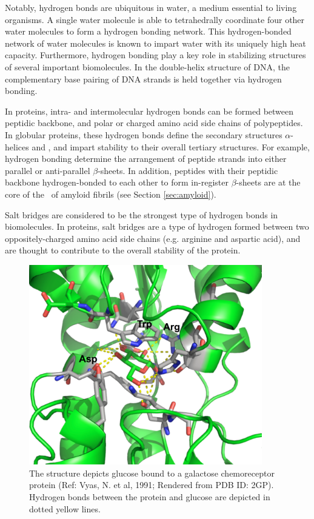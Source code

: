 Notably, hydrogen bonds are ubiquitous in water, a medium essential to living organisms. A single water molecule is able to tetrahedrally coordinate four other water molecules to form a hydrogen bonding network. This hydrogen-bonded network of water molecules is known to impart water with its uniquely high heat capacity.  Furthermore, hydrogen bonding play a key role in stabilizing structures of several important biomolecules.  In the double-helix structure of DNA,  the complementary base pairing of DNA strands is held together via hydrogen bonding.

In proteins, intra- and intermolecular hydrogen bonds can be formed between peptidic backbone, and polar or charged amino acid side chains of polypeptides.  In globular proteins, these hydrogen bonds define the secondary structures $\alpha$-helices and \bsheets, and impart stability to their overall tertiary structures. For example, hydrogen bonding determine the arrangement of peptide strands into either parallel or anti-parallel $\beta$-sheets. In addition, peptides with their peptidic backbone hydrogen-bonded to each other to form in-register $\beta$-sheets are at the core of the \crossbs\ of amyloid fibrils (see Section \ref{sec:amyloid}). 

Salt bridges are considered to be the strongest type of hydrogen bonds in biomolecules.  In proteins, salt bridges are a type of hydrogen formed between two oppositely-charged amino acid side chains (e.g. arginine and aspartic acid), and are thought to contribute to the overall stability of the protein.\cite{Nakamura:1996vm,Pace:2000eg}

\begin{figure}
 \centering
 \includegraphics[width=4in]{figures/introduction/sugar_protein_binding.pdf}
 \caption[An example of sugar-lectin binding]{The structure depicts glucose bound to a galactose chemoreceptor protein (Ref: Vyas, N. et al, 1991; Rendered from PDB ID: 2GP). Hydrogen bonds between the protein and glucose are depicted in dotted yellow lines. }
 \label{fig:sugar_protein}
\end{figure}

